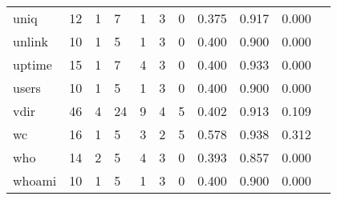 \begin{longtable}{lp{1.10cm}p{1.10cm}p{1.10cm}p{1.10cm}p{1.10cm}p{1.10cm}p{1.10cm}p{1.10cm}p{1.10cm}p{1.10cm}}
uniq      &                     12 &                                  1 &                                 7 &                                1 &                                 3 &                               0 &                          0.375 &                                 0.917 &                               0.000 \\
unlink    &                     10 &                                  1 &                                 5 &                                1 &                                 3 &                               0 &                          0.400 &                                 0.900 &                               0.000 \\
uptime    &                     15 &                                  1 &                                 7 &                                4 &                                 3 &                               0 &                          0.400 &                                 0.933 &                               0.000 \\
users     &                     10 &                                  1 &                                 5 &                                1 &                                 3 &                               0 &                          0.400 &                                 0.900 &                               0.000 \\
vdir      &                     46 &                                  4 &                                24 &                                9 &                                 4 &                               5 &                          0.402 &                                 0.913 &                               0.109 \\
wc        &                     16 &                                  1 &                                 5 &                                3 &                                 2 &                               5 &                          0.578 &                                 0.938 &                               0.312 \\
who       &                     14 &                                  2 &                                 5 &                                4 &                                 3 &                               0 &                          0.393 &                                 0.857 &                               0.000 \\
whoami    &                     10 &                                  1 &                                 5 &                                1 &                                 3 &                               0 &                          0.400 &                                 0.900 &                               0.000 \\

\end{longtable}
